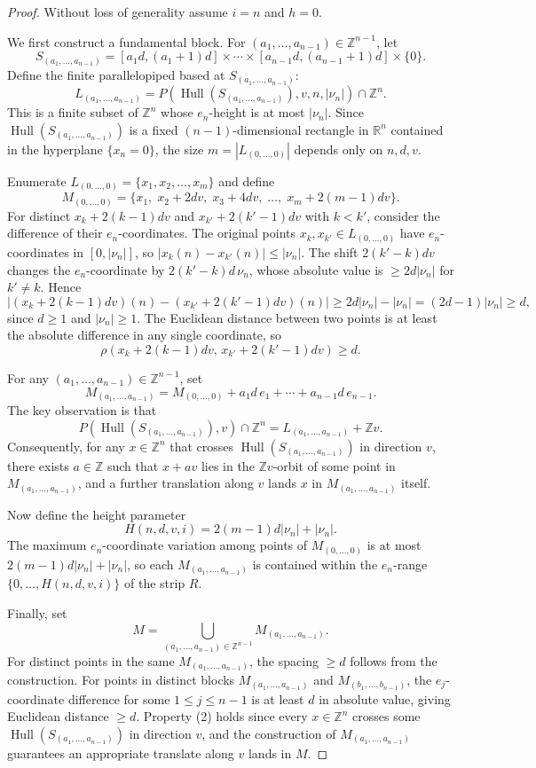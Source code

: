 \documentclass{amsart}
\theoremstyle{definition}
\DeclareMathOperator{\Hull}{Hull}
\begin{document}
\begin{proof}
Without loss of generality assume $i=n$ and $h=0$.

We first construct a fundamental block. For
$(a_1,\dots, a_{n-1})\in \mathbb{Z}^{n-1}$, let
\[
S_{(a_1,\dots, a_{n-1})}=[a_1d, (a_1+1)d]\times\cdots
\times[a_{n-1}d, (a_{n-1}+1)d]\times\{0\}.
\]
Define the finite parallelopiped based at $S_{(a_1,\dots, a_{n-1})}$:
\[
L_{(a_1,\dots, a_{n-1})}
=P(\Hull(S_{(a_1,\dots, a_{n-1})}), v, n, |\nu_n|)\cap\mathbb{Z}^n.
\]
This is a finite subset of $\mathbb{Z}^n$ whose $e_n$-height is at most
$|\nu_n|$. Since $\Hull(S_{(a_1,\dots, a_{n-1})})$ is a fixed
$(n-1)$-dimensional rectangle in $\mathbb{R}^n$ contained in the hyperplane
$\{x_n=0\}$, the size $m=|L_{(0,\dots,0)}|$ depends only on $n, d, v$.

Enumerate $L_{(0,\dots,0)}=\{x_1, x_2, \dots, x_m\}$ and define
\[
M_{(0,\dots,0)}=\{x_1,\; x_2+2dv,\; x_3+4dv,\; \dots,\;
x_m+2(m-1)dv\}.
\]
For distinct $x_k+2(k-1)dv$ and $x_{k'}+2(k'-1)dv$ with $k<k'$, consider the difference of their $e_n$-coordinates. The original points
$x_k, x_{k'}\in L_{(0,\dots,0)}$ have $e_n$-coordinates in
$[0,|\nu_n|]$, so $|x_k(n)-x_{k'}(n)|\leq |\nu_n|$. The shift
$2(k'-k)dv$ changes the $e_n$-coordinate by $2(k'-k)d\,\nu_n$, whose
absolute value is $\geq 2d|\nu_n|$ for $k'\neq k$. Hence
\[
|(x_k+2(k-1)dv)(n)-(x_{k'}+2(k'-1)dv)(n)|
\geq 2d|\nu_n|-|\nu_n|
= (2d-1)|\nu_n| \geq d,
\]
since $d\geq 1$ and $|\nu_n|\geq 1$. The Euclidean distance between two
points is at least the absolute difference in any single coordinate,
so $$\rho(x_k+2(k-1)dv,\,x_{k'}+2(k'-1)dv)\geq d.$$

For any $(a_1,\dots, a_{n-1})\in \mathbb{Z}^{n-1}$, set
\[
M_{(a_1,\dots, a_{n-1})}=M_{(0,\dots,0)}+a_1d\, e_1
+\cdots+a_{n-1}d\, e_{n-1}.
\]
The key observation is that
\[
P(\Hull(S_{(a_1,\dots, a_{n-1})}), v)\cap\mathbb{Z}^n
= L_{(a_1,\dots, a_{n-1})}+\mathbb{Z}v.
\]
Consequently, for any $x\in\mathbb{Z}^n$ that crosses
$\Hull(S_{(a_1,\dots, a_{n-1})})$ in direction $v$, there exists
$a\in\mathbb{Z}$ such that $x+av$ lies in the $\mathbb{Z}v$-orbit of some
point in $M_{(a_1,\dots, a_{n-1})}$, and a further translation along $v$
lands $x$ in $M_{(a_1,\dots, a_{n-1})}$ itself.

Now define the height parameter
\[
H(n, d, v, i)=2(m-1)d|\nu_n|+|\nu_n|.
\]
The maximum $e_n$-coordinate variation among points of $M_{(0,\dots,0)}$
is at most $2(m-1)d|\nu_n|+|\nu_n|$, so each
$M_{(a_1,\dots, a_{n-1})}$ is contained within the $e_n$-range
$\{0,\dots, H(n,d,v,i)\}$ of the strip $R$.

Finally, set
\[
M=\bigcup_{(a_1,\dots, a_{n-1})\in\mathbb{Z}^{n-1}}
M_{(a_1,\dots, a_{n-1})}.
\]
For distinct points in the same $M_{(a_1,\dots, a_{n-1})}$, the spacing
$\geq d$ follows from the construction. For points in distinct blocks
$M_{(a_1,\dots, a_{n-1})}$ and $M_{(b_1,\dots, b_{n-1})}$, the
$e_j$-coordinate difference for some $1\leq j\leq n-1$ is at least $d$
in absolute value, giving Euclidean distance $\geq d$. Property (2) holds
since every $x\in\mathbb{Z}^n$ crosses some
$\Hull(S_{(a_1,\dots, a_{n-1})})$ in direction $v$, and the construction of
$M_{(a_1,\dots, a_{n-1})}$ guarantees an appropriate translate along $v$
lands in $M$.
\end{proof}
\end{document}
